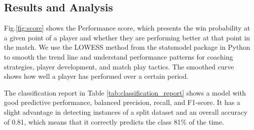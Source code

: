 \documentclass{mcmthesis}
\begin{document}
\subsection{Results and Analysis}

Fig.\ref{fig:score} shows the Performance score, which presents the win probability at a given point of a player and whether they are performing better at that point in the match. We use the LOWESS method from the statsmodel package in Python to smooth the trend line and understand performance patterns for coaching strategies, player development, and match play tactics. The smoothed curve shows how well a player has performed over a certain period.

The classification report in Table \ref{tab:classification_report} shows a model with good predictive performance, balanced precision, recall, and F1-score. It has a slight advantage in detecting instances of a split dataset and an overall accuracy of 0.81, which means that it correctly predicts the class 81\% of the time. 
\end{document}
